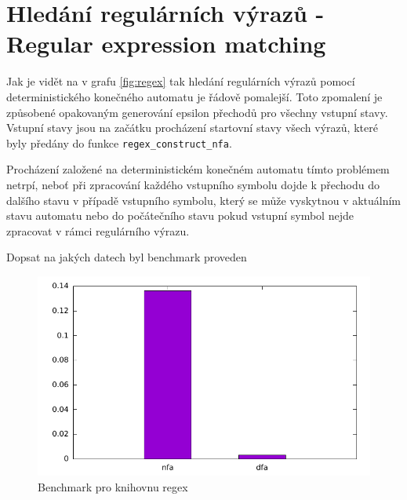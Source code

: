 \section{Hledání regulárních výrazů - Regular expression matching} %

Jak je vidět na v grafu \ref{fig:regex} tak hledání regulárních výrazů pomocí deterministického
konečného automatu je řádově pomalejší. Toto zpomalení je způsobené opakovaným generování
epsilon přechodů pro všechny vstupní stavy. Vstupní stavy jsou na začátku procházení
startovní stavy všech výrazů, které byly předány do funkce \texttt{regex\_construct\_nfa}.

Procházení založené na deterministickém konečném automatu tímto problémem netrpí,
neboť při zpracování každého vstupního symbolu dojde k přechodu do dalšího stavu v případě
vstupního symbolu, který se může vyskytnou v aktuálním stavu automatu nebo do počátečního stavu
pokud vstupní symbol nejde zpracovat v rámci regulárního výrazu.

Dopsat na jakých datech byl benchmark proveden

\begin{figure}[!htbp]
	\centering
	\includegraphics[scale=0.7]{fig/regex.pdf}
	\caption{Benchmark pro knihovnu regex}
\end{figure}\label{fig:regex}

